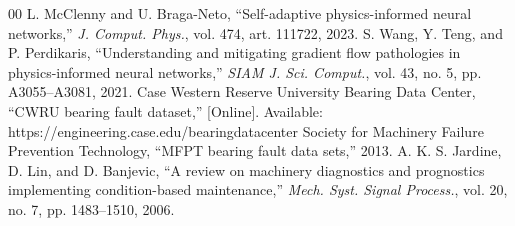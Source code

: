 \documentclass[conference]{IEEEtran}
\begin{document}
\begin{thebibliography}{00}
 L. McClenny and U. Braga-Neto, ``Self-adaptive
physics-informed neural networks,'' \textit{J. Comput. Phys.}, vol. 474, art.
111722, 2023.
 S. Wang, Y. Teng, and P. Perdikaris, ``Understanding and
mitigating gradient flow pathologies in physics-informed neural networks,''
\textit{SIAM J. Sci. Comput.}, vol. 43, no. 5, pp. A3055--A3081, 2021.
 Case Western Reserve University Bearing Data Center, ``CWRU
bearing fault dataset,'' [Online]. Available:
https://engineering.case.edu/bearingdatacenter
 Society for Machinery Failure Prevention Technology, ``MFPT
bearing fault data sets,'' 2013.
 A. K. S. Jardine, D. Lin, and D. Banjevic, ``A review on
machinery diagnostics and prognostics implementing condition-based
maintenance,'' \textit{Mech. Syst. Signal Process.}, vol. 20, no. 7, pp.
1483--1510, 2006.
\end{thebibliography}
\end{document}
